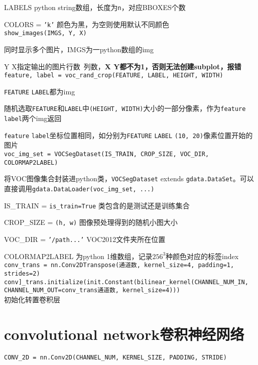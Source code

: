 \documentclass[UTF8]{ctexart}
\begin{document}
  LABELS python string数组，长度为\texttt{n}，对应BBOXES个数

  COLORS = \texttt{'k'} 颜色为黑，为空则使用默认不同颜色\\
\texttt{show\_images(IMGS, Y, X)}

  同时显示多个图片，IMGS为一python数组的img

  Y X指定输出的图片行数\ 列数，\textbf{X Y都不为1，否则无法创建subplot，报错}\\
\texttt{feature, label = voc\_rand\_crop(FEATURE, LABEL, HEIGHT, WIDTH)}

  \texttt{FEATURE} \texttt{LABEL}都为img

  随机选取\texttt{FEATURE}和\texttt{LABEL}中\texttt{(HEIGHT, WIDTH)}大小的一部分像素，作为\texttt{feature} \texttt{label}两个img返回
  
  \texttt{feature} \texttt{label}坐标位置相同，如分别为\texttt{FEATURE} \texttt{LABEL} \texttt{(10, 20)}像素位置开始的图片\\
\texttt{voc\_img\_set = VOCSegDataset(IS\_TRAIN, CROP\_SIZE, VOC\_DIR, COLORMAP2LABEL)}

  将VOC图像集合封装进python类，\texttt{VOCSegDataset} extends \texttt{gdata.DataSet}。可以直接调用\texttt{gdata.DataLoader(voc\_img\_set, ...)}

  IS\_TRAIN = \texttt{is\_train=True} 类包含的是测试还是训练集合

  CROP\_SIZE = \texttt{(h, w)} 图像预处理得到的随机小图大小

  VOC\_DIR = \texttt{'/path...'} VOC2012文件夹所在位置

  COLORMAP2LABEL 为python 1维数组，记录$256^3$种颜色对应的标签index\\
\texttt{conv\_trans = nn.Conv2DTranspose(通道数, kernel\_size=4, padding=1, strides=2)}\\
\texttt{conv]\_trans.initialize(init.Constant(bilinear\_kernel(CHANNEL\_NUM\_IN, CHANNEL\_NUM\_OUT=conv\_trans通道数, kernel\_size=4)))}\\

  初始化转置卷积层
\section{convolutional network卷积神经网络}
\noindent \texttt{CONV\_2D = nn.Conv2D(CHANNEL\_NUM, KERNEL\_SIZE, PADDING, STRIDE)}
\end{document}
